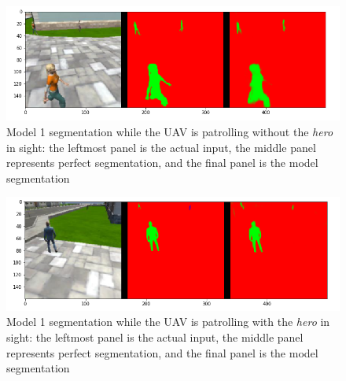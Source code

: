 \documentclass[a4paper]{article}
\begin{document}
\begin{figure}[h]
\centering
\includegraphics[scale=0.4]{model_1_2}
\caption{Model 1 segmentation while the UAV is patrolling without the \textit{hero} in sight: the leftmost panel is the actual input, the middle panel represents perfect segmentation, and the final panel is the model segmentation}
\end{figure}

\begin{figure}[h]
\centering
\includegraphics[scale=0.4]{model_1_3}
\caption{Model 1 segmentation while the UAV is patrolling with the \textit{hero} in sight: the leftmost panel is the actual input, the middle panel represents perfect segmentation, and the final panel is the model segmentation}
\end{figure}

\clearpage
\end{document}
